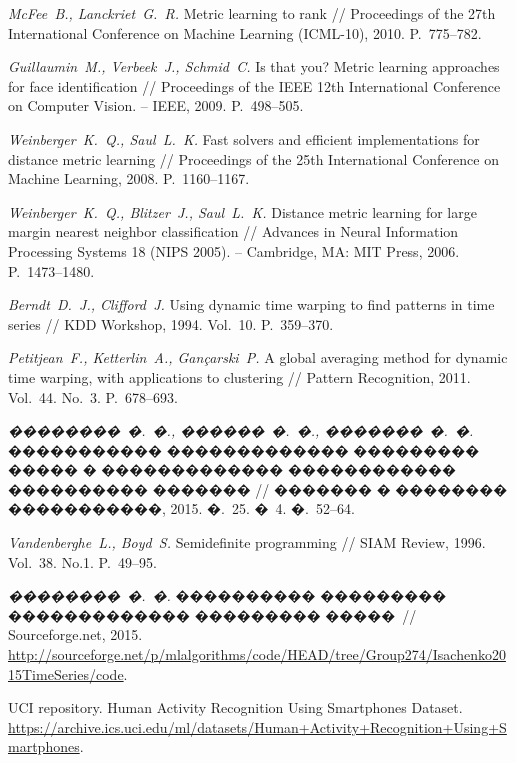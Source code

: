 \documentclass[12pt,twoside, notitlepage]{article}
\begin{document}
\begin{thebibliography}{10}
\emph{McFee~B., Lanckriet~G.~R.}
\newblock Metric learning to rank // Proceedings of the 27th International Conference on Machine
  Learning (ICML-10), 2010. P.~775--782.

\emph{Guillaumin~M., Verbeek~J., Schmid~C.}
\newblock Is that you? Metric learning approaches for face identification // Proceedings of the IEEE 12th International Conference on Computer Vision. -- IEEE, 2009. P.~498--505.

\emph{Weinberger~K.~Q., Saul~L.~K.}
\newblock Fast solvers and efficient implementations for distance metric
  learning // Proceedings of the 25th International Conference on Machine
Learning, 2008. P.~1160--1167.

\emph{Weinberger~K.~Q., Blitzer~J., Saul~L.~K.}
\newblock Distance metric learning for large margin nearest neighbor
  classification // Advances in Neural Information Processing Systems 18 (NIPS 2005). -- Cambridge, MA: MIT Press, 2006. P.~1473--1480.

\emph{Berndt~D.~J., Clifford~J.}
\newblock Using dynamic time warping to find patterns in time series // KDD Workshop, 1994. Vol.~10. P.~359--370.

\emph{Petitjean~F., Ketterlin~A., Gan{\c{c}}arski~P.}
\newblock A global averaging method for dynamic time warping, with applications
  to clustering // Pattern Recognition, 2011. Vol.~44. No.~3. P.~678--693.

\emph{��������~�.~�., ������~�.~�., �������~�.~�.}
\newblock ����������� ������������� ��������� ����� � �������������
  ������������ ���������� ������� // ������� � �������� �����������, 2015. �.~25. �~4. �.~52--64.

\emph{Vandenberghe~L., Boyd~S.}
\newblock Semidefinite programming // SIAM Review, 1996. Vol.~38. No.1. P.~49--95.

\emph{��������~�.~�.}
\newblock ���������� ��������� ������������� ��������� �����~// Sourceforge.net, 2015.
\newblock \url{http://sourceforge.net/p/mlalgorithms/code/HEAD/tree/Group274/Isachenko2015TimeSeries/code}.


UCI repository. Human Activity Recognition Using Smartphones Dataset.
\newblock \url{https://archive.ics.uci.edu/ml/datasets/Human+Activity+Recognition+Using+Smartphones}.

\end{thebibliography}
\end{document}
